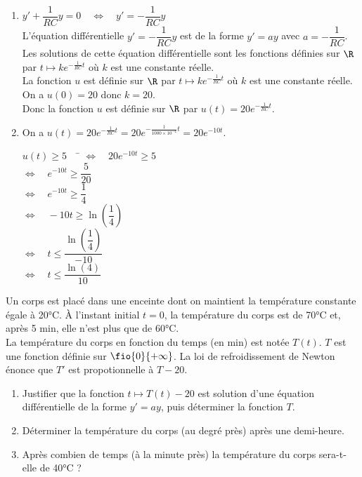 \documentclass[a4paper,11pt,exos]{nsi} %
\begin{document}
\textcolor{UGLiBlue}{
    \begin{enumerate}
        \item $y'+\dfrac{1}{RC}y=0 \quad \iff \quad y'=-\dfrac{1}{RC}y$\\[.5em]
        L'équation différentielle $y'=-\dfrac{1}{RC}y$ est de la forme $y'=ay$ avec $a=-\dfrac{1}{RC}$.\\
        Les solutions de cette équation différentielle sont les fonctions définies sur $\R$ par $t\mapsto ke^{-\frac{1}{RC}t}$ où $k$ est une constante réelle.\\
        La fonction $u$ est définie sur $\R$ par $t\mapsto ke^{-\frac{1}{RC}t}$ où $k$ est une constante réelle.\\
        On a $u(0)=20$ donc $k=20$.\\
        Donc la fonction $u$ est définie sur $\R$ par $u(t)= 20e^{-\frac{1}{RC}t}$.
        \item On a $u(t)=20e^{-\frac{1}{RC}t}=20e^{-\frac{1}{1000\times 10^{-4}}t}=20e^{-10t}$.
        \begin{tabbing}
            $u(t)\geqslant 5 \quad$ \= $\iff \quad 20e^{-10t}\geqslant 5$\\
            \> $\iff \quad e^{-10t}\geqslant \dfrac{5}{20}$\\
            \> $\iff \quad e^{-10t}\geqslant \dfrac{1}{4}$\\[.5em]
            \> $\iff \quad -10t\geqslant \ln\left(\dfrac{1}{4}\right)$\\[.5em]
            \> $\iff \quad t\leqslant \dfrac{\ln\left(\dfrac{1}{4}\right)}{-10}$\\[.5em]
            \> $\iff \quad t\leqslant \dfrac{\ln(4)}{10}$
        \end{tabbing}
    \end{enumerate}
}

\newpage
{}
Un corps est placé dans une enceinte dont on maintient la température constante égale à 20°C. À l'instant initial $t=0$, la température du corps est de 70°C et, après 5 min, elle n'est plus que de 60°C.\\
La température du corps en fonction du temps (en min) est notée $T(t)$. $T$ est une fonction définie sur $\fio{0}{+\infty}$. La loi de refroidissement de Newton énonce que $T'$ est propotionnelle à $T-20$.
\begin{enumerate}
    \item Justifier que la fonction $t\mapsto T(t)-20$ est solution d'une équation différentielle de la forme $y'=ay$, puis déterminer la fonction $T$.
    \item Déterminer la température du corps (au degré près) après une demi-heure.
    \item Après combien de temps (à la minute près) la température du corps sera-t-elle de 40°C ?
\end{enumerate}
\end{document}
